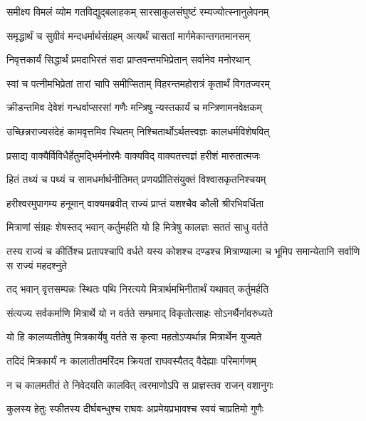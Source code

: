 
\twolineshloka
{समीक्ष्य विमलं व्योम गतविद्युद्बलाहकम्}
{सारसाकुलसंघुष्टं रम्यज्योत्स्नानुलेपनम्} %

\twolineshloka
{समृद्धार्थं च सुग्रीवं मन्दधर्मार्थसंग्रहम्}
{अत्यर्थं चासतां मार्गमेकान्तगतमानसम्} %

\twolineshloka
{निवृत्तकार्यं सिद्धार्थं प्रमदाभिरतं सदा}
{प्राप्तवन्तमभिप्रेतान् सर्वानेव मनोरथान्} %

\twolineshloka
{स्वां च पत्नीमभिप्रेतां तारां चापि समीप्सिताम्}
{विहरन्तमहोरात्रं कृतार्थं विगतज्वरम्} %

\twolineshloka
{क्रीडन्तमिव देवेशं गन्धर्वाप्सरसां गणैः}
{मन्त्रिषु न्यस्तकार्यं च मन्त्रिणामनवेक्षकम्} %

\twolineshloka
{उच्छिन्नराज्यसंदेहं कामवृत्तमिव स्थितम्}
{निश्चितार्थोऽर्थतत्त्वज्ञः कालधर्मविशेषवित्} %

\twolineshloka
{प्रसाद्य वाक्यैर्विविधैर्हेतुमद्भिर्मनोरमैः}
{वाक्यविद् वाक्यतत्त्वज्ञं हरीशं मारुतात्मजः} %

\twolineshloka
{हितं तथ्यं च पथ्यं च सामधर्मार्थनीतिमत्}
{प्रणयप्रीतिसंयुक्तं विश्वासकृतनिश्चयम्} %

\twolineshloka
{हरीश्वरमुपागम्य हनूमान् वाक्यमब्रवीत्}
{राज्यं प्राप्तं यशश्चैव कौली श्रीरभिवर्धिता} %

\twolineshloka
{मित्राणां संग्रहः शेषस्तद् भवान् कर्तुमर्हति}
{यो हि मित्रेषु कालज्ञः सततं साधु वर्तते} %

\threelineshloka
{तस्य राज्यं च कीर्तिश्च प्रतापश्चापि वर्धते}
{यस्य कोशश्च दण्डश्च मित्राण्यात्मा च भूमिप}
{समान्येतानि सर्वाणि स राज्यं महदश्नुते} %

\twolineshloka
{तद् भवान् वृत्तसम्पन्नः स्थितः पथि निरत्यये}
{मित्रार्थमभिनीतार्थं यथावत् कर्तुमर्हति} %

\twolineshloka
{संत्यज्य सर्वकर्माणि मित्रार्थे यो न वर्तते}
{सम्भ्रमाद् विकृतोत्साहः सोऽनर्थैर्नावरुध्यते} %

\twolineshloka
{यो हि कालव्यतीतेषु मित्रकार्येषु वर्तते}
{स कृत्वा महतोऽप्यर्थान्न मित्रार्थेन युज्यते} %

\twolineshloka
{तदिदं मित्रकार्यं नः कालातीतमरिंदम}
{क्रियतां राघवस्यैतद् वैदेह्याः परिमार्गणम्} %

\twolineshloka
{न च कालमतीतं ते निवेदयति कालवित्}
{त्वरमाणोऽपि स प्राज्ञस्तव राजन् वशानुगः} %

\twolineshloka
{कुलस्य हेतुः स्फीतस्य दीर्घबन्धुश्च राघवः}
{अप्रमेयप्रभावश्च स्वयं चाप्रतिमो गुणैः} %

